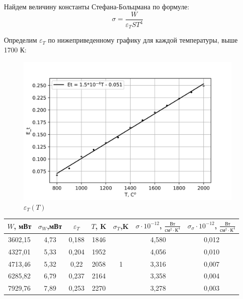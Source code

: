 \documentclass[a4paper,12pt]{report}
\begin{document}
Найдем величину константы Стефана-Больцмана по формуле:
\begin{equation*}
    \sigma = \frac{W}{\varepsilon_{T}ST^{4}}
\end{equation*}

Определим $\varepsilon_{T}$ по нижеприведенному графику для каждой температуры, выше 1700 К:

\begin{figure}[H]
    \centering
    \includegraphics[width=14cm]{Et(T).png}
    \caption{$\varepsilon_{T}(T)$}
    \label{fig:vac}
\end{figure}

\begin{table}[H]
\begin{tabular}{|c|c|c|c|c|c|c|}
\hline
$W$, мВт  & $\sigma_{W}$,мВт & $\varepsilon_{T}$    & $T$, K & $\sigma_{T}$,K             & $\sigma \cdot 10^{-12}$, $\frac{\text{Вт}}{\text{см}^{2}\cdot \text{К}^{4}}$& $\sigma_{\sigma} \cdot10^{-12}$, $\frac{\text{Вт}}{\text{см}^{2}\cdot \text{К}^{4}}$ \\ \hline
3602,15 & 4,73       & 0,188 & 1846 & \multirow{5}{*}{1} & 4,580                               & 0,012                                   \\ \cline{1-4} \cline{6-7} 
4327,01 & 5,33       & 0,204 & 1952 &                    & 4,056                               & 0,010                                   \\ \cline{1-4} \cline{6-7} 
4713,46 & 5,32       & 0,22  & 2058 &                    & 3,316                               & 0,007                                   \\ \cline{1-4} \cline{6-7} 
6285,82 & 6,79       & 0,237 & 2164 &                    & 3,358                               & 0,004                                   \\ \cline{1-4} \cline{6-7} 
7929,76 & 7,89       & 0,253 & 2270 &                    & 3,278                               & 0,003                                   \\ \hline
\end{tabular}
\end{table}
\end{document}
